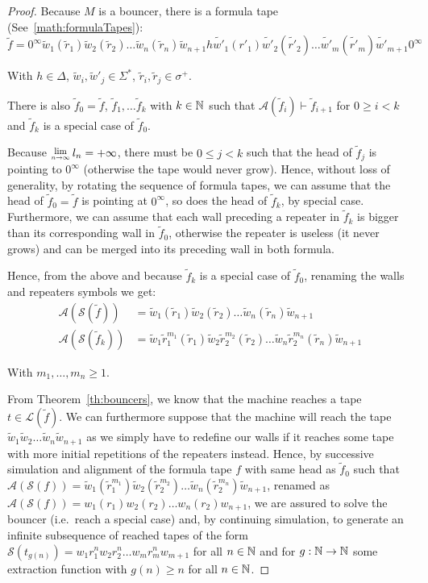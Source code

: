 \begin{proof}
    Because $M$ is a bouncer, there is a formula tape (See~\eqref{math:formulaTapes}): $$\tilde{f} = 0^\infty\tilde{w}_1(\tilde{r}_1)\tilde{w}_2(\tilde{r}_2)\dots \tilde{w}_n(\tilde{r}_n) \tilde{w}_{n+1} h \tilde{w'}_1(r'_1)\tilde{w'}_2(\tilde{r'}_2)\dots \tilde{w'}_m(\tilde{r'}_m) \tilde{w'}_{m+1}0^\infty$$

    With $h\in\Delta$, $\tilde{w}_i, \tilde{w}'_j \in \Sigma^*$, $\tilde{r}_i, \tilde{r}_j \in \sigma^+$.

    There is also $\tilde{f}_0 = \tilde{f}$, $\tilde{f}_1, \dots \tilde{f}_k$ with $k \in \mathbb{N}$ such that $\mathcal{A}(\tilde{f}_i) \vdash \tilde{f}_{i+1}$ for $0 \geq i < k$ and $\tilde{f}_k$ is a special case of $\tilde{f}_0$.

    Because $\Lim{n\to\infty} l_n = +\infty$, there must be $0 \leq j < k$ such that the head of $\tilde{f}_{j}$ is pointing to $0^\infty$ (otherwise the tape would never grow). Hence, without loss of generality, by rotating the sequence of formula tapes, we can assume that the head of $\tilde{f}_{0}=\tilde{f}$ is pointing at $0^\infty$, so does the head of $\tilde{f}_k$, by special case. Furthermore, we can assume that each wall preceding a repeater in $\tilde{f}_k$ is bigger than its corresponding wall in $\tilde{f}_0$, otherwise the repeater is useless (it never grows) and can be merged into its preceding wall in both formula.

    Hence, from the above and because $\tilde{f}_k$ is a special case of $\tilde{f}_0$, renaming the walls and repeaters symbols we get:
    \begin{align*}
        \mathcal{A}(\mathcal{S}(\tilde{f}))   & = \tilde{w}_1(\tilde{r}_1)\tilde{w}_2(\tilde{r}_2)\dots \tilde{w}_n(\tilde{r}_n) \tilde{w}_{n+1}                                                    \\
        \mathcal{A}(\mathcal{S}(\tilde{f}_k)) & = \tilde{w}_1\tilde{r}_1^{m_1}(\tilde{r}_1)\tilde{w}_2\tilde{r}_2^{m_2}(\tilde{r}_2)\dots \tilde{w}_n\tilde{r}_2^{m_n}(\tilde{r}_n) \tilde{w}_{n+1}
    \end{align*}

    With $m_1, \dots, m_n \geq 1$.

    From Theorem~\ref{th:bouncers}, we know that the machine reaches a tape $t\in\mathcal{L}(\tilde{f})$. We can furthermore suppose that the machine will reach the tape $\tilde{w}_1\tilde{w}_2\dots \tilde{w}_n \tilde{w}_{n+1}$ as we simply have to redefine our walls if it reaches some tape with more initial repetitions of the repeaters instead. Hence, by successive simulation and alignment of the formula tape $f$ with same head as $\tilde{f}_0$  such that $\mathcal{A}(\mathcal{S}(f)) = \tilde{w}_1(\tilde{r}_1^{m_1})\tilde{w}_2(\tilde{r}_2^{m_2})\dots \tilde{w}_n(\tilde{r}_2^{m_n}) \tilde{w}_{n+1}$, renamed as $\mathcal{A}(\mathcal{S}(f)) = w_1(r_1)w_2(r_2)\dots w_n(r_2) w_{n+1}$, we are assured to solve the bouncer (i.e.\ reach a special case) and, by continuing simulation, to generate an infinite subsequence of reached tapes of the form $\mathcal{S}(t_{g(n)})=w_1 r_1^n w_2 r_2^n \dots w_m r_m^n w_{m+1}$ for all $n\in\mathbb{N}$ and for $g: \mathbb{N} \to \mathbb{N}$ some extraction function with $g(n) \geq n$ for all $n \in \mathbb{N}$.


\end{proof}
